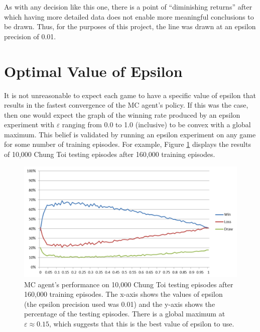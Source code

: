 \documentclass[11pt,a4paper]{report}
\begin{document}
As with any decision like this one, there is a point of ``diminishing returns'' after which having more detailed data does not enable more meaningful conclusions to be drawn. Thus, for the purposes of this project, the line was drawn at an epsilon precision of 0.01.


\section{Optimal Value of Epsilon}
\label{sec:optimal_epsilon}

It is not unreasonable to expect each game to have a specific value of epsilon that results in the fastest convergence of the MC agent's policy. If this was the case, then one would expect the graph of the winning rate produced by an epsilon experiment with $\varepsilon$ ranging from 0.0 to 1.0 (inclusive) to be convex with a global maximum. This belief is validated by running an epsilon experiment on any game for some number of training episodes. For example, Figure \ref{chung-toi-epsilon-160ktrain-10ktest} displays the results of 10,000 Chung Toi testing episodes after 160,000 training episodes.

\begin{figure}[htbp]
	\begin{center}
		\includegraphics[width=\linewidth]{ChungToi_EpsilonResults_160kTrainingGames_10kTestingGames.png}
		\caption{MC agent's performance on 10,000 Chung Toi testing episodes after 160,000 training episodes. The x-axis shows the values of epsilon (the epsilon precision used was 0.01) and the y-axis shows the percentage of the testing episodes. There is a global maximum at $\varepsilon \approx 0.15$, which suggests that this is the best value of epsilon to use.}
		\label{chung-toi-epsilon-160ktrain-10ktest}
	\end{center}
\end{figure}
\end{document}
